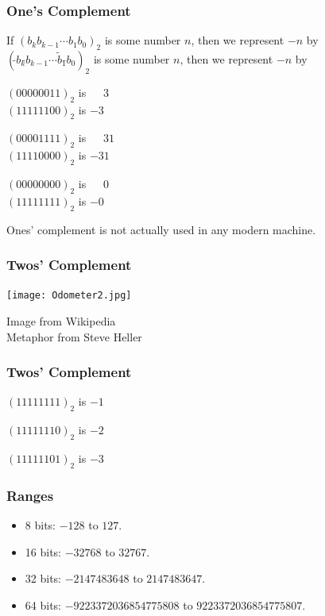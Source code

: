 \begin{frame}[fragile]
\frametitle{One's Complement}

If $(b_k b_{k-1}\cdots b_1 b_0)_2$ is some number $n$, then we represent $-n$ by\\
$(\tilde{}b_k \tilde{}b_{k-1}\cdots \tilde b_1 \tilde{} b_0)_2$ is some number $n$, then we represent $-n$ by

\pause

$(00000011)_2$ is $\phantom{-}3$\\
$(11111100)_2$ is $-3$

\bigskip

$(00001111)_2$ is $\phantom{-}31$\\
$(11110000)_2$ is $-31$

\bigskip

$(00000000)_2$ is $\phantom{-}0$\\
$(11111111)_2$ is $-0$


\pause

Ones' complement is not actually used in any modern machine.

\end{frame}

\begin{frame}[fragile]
\frametitle{Twos' Complement}

\centering
\texttt{[image: Odometer2.jpg]}

\begin{flushright}
Image from Wikipedia\\
Metaphor from Steve Heller
\end{flushright}
\end{frame}

\begin{frame}[fragile]
\frametitle{Twos' Complement}

$(11111111)_2$ is $-1$

$(11111110)_2$ is $-2$

$(11111101)_2$ is $-3$

\end{frame}

\begin{frame}[fragile]
\frametitle{Ranges}

\begin{itemize}
\item 8 bits: $-128$ to $127$.
\item 16 bits: $-32768$ to $32767$.
\item 32 bits: $-2147483648$ to $2147483647$.
\item 64 bits: $-9223372036854775808$ to $9223372036854775807$.
\end{itemize}
\end{frame}

